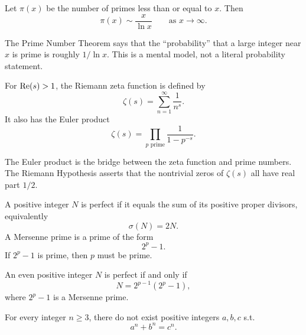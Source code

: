     \begin{theorem}
        Let $\pi(x)$ be the number of primes less than or equal to $x$. Then
        \[
            \pi(x)\sim \frac{x}{\ln x}
            \qquad
            \text{as }x\to\infty.
        \]
    \end{theorem}

    \begin{idea}
        The Prime Number Theorem says that the ``probability'' that a large
        integer near $x$ is prime is roughly $1/\ln x$. This is a mental model,
        not a literal probability statement.
    \end{idea}

    \begin{definition}
        For $\operatorname{Re}(s)>1$, the Riemann zeta function is defined by
        \[
            \zeta(s)
            =
            \sum_{n=1}^{\infty}\frac{1}{n^s}.
        \]
        It also has the Euler product
        \[
            \zeta(s)
            =
            \prod_{p\text{ prime}}
            \frac{1}{1-p^{-s}}.
        \]
    \end{definition}

    \begin{remark}
        The Euler product is the bridge between the zeta function and prime
        numbers. The Riemann Hypothesis asserts that the nontrivial zeros of
        $\zeta(s)$ all have real part $1/2$.
    \end{remark}

    \begin{definition}
        A positive integer $N$ is perfect if it equals the sum of its positive
        proper divisors, equivalently
        \[
            \sigma(N)=2N.
        \]
        A Mersenne prime is a prime of the form
        \[
            2^p-1.
        \]
        If $2^p-1$ is prime, then $p$ must be prime.
    \end{definition}

    \begin{theorem}
        An even positive integer $N$ is perfect if and only if
        \[
            N=2^{p-1}(2^p-1),
        \]
        where $2^p-1$ is a Mersenne prime.
    \end{theorem}

    \begin{theorem}
        For every integer $n\geq 3$, there do not exist positive integers
        $a,b,c$ s.t.
        \[
            a^n+b^n=c^n.
        \]
    \end{theorem}

